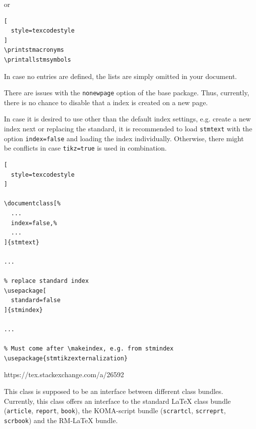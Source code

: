 \documentclass[%
  type=article,%
  layout=koma,%
  fleqn,%
  page=false,%
  cleveref=true,%
  conditionallox=true,%
  conditionalloxnewpage=true,%
  date=true,%
  glossaries=true,%
  hyperref=true,%
  index=true,%
  listings=true%
]{stmtext}
\begin{document}
or

\begin{lstlisting}[
  style=texcodestyle
]
\printstmacronyms
\printallstmsymbols
\end{lstlisting}

In case no entries are defined, the lists are simply omitted in your document.%

\label{sec:options:index}


There are issues with the \texttt{nonewpage} option of the base package. Thus, currently, there is no chance to disable that a index is created on a new page.

In case it is desired to use other than the default index settings, e.g. create a new index next or replacing the standard, it is recommended to load \texttt{stmtext} with the option \texttt{index=false} and loading the index individually. Otherwise, there might be conflicts in case \texttt{tikz=true} is used in combination.

\begin{lstlisting}[
  style=texcodestyle
]

\documentclass[%
  ...
  index=false,%
  ...
]{stmtext}

...

% replace standard index
\usepackage[
  standard=false
]{stmindex}

...

% Must come after \makeindex, e.g. from stmindex
\usepackage{stmtikzexternalization}
\end{lstlisting}


\label{sec:options:hyperref}

https://tex.stackexchange.com/a/26592


\label{sec:options:layout}

This class is supposed to be an interface between different class bundles. Currently, this class offers an interface to the standard \LaTeX{} class bundle (\texttt{article}, \texttt{report}, \texttt{book}), the KOMA-script bundle (\texttt{scrartcl}, \texttt{scrreprt}, \texttt{scrbook}) and the RM-\LaTeX{} bundle.
\end{document}
